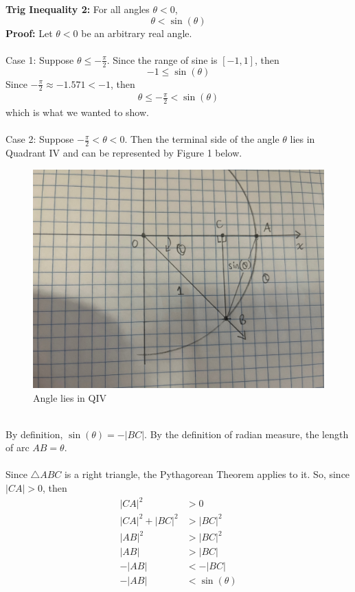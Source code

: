 \documentclass{article}
\begin{document}
	\textbf{Trig Inequality 2:} For all angles $\theta < 0$,
	$$\theta < \sin{(\theta)}$$
	\textbf{Proof:}
	Let $\theta < 0$ be an arbitrary real angle. \\\\
	Case 1: Suppose $\theta \leq -\frac{\pi}{2}$. Since the range of sine is $[-1, 1]$, then
	$$-1 \leq \sin{(\theta)}$$
	Since $-\frac{\pi}{2} \approx -1.571 < -1$, then
	\begin{align*}
		\theta \leq -\frac{\pi}{2} < \sin{(\theta)}
	\end{align*}
	which is what we wanted to show. \\\\
	Case 2: Suppose $-\frac{\pi}{2} < \theta < 0$. Then the terminal side of the angle $\theta$ lies in Quadrant IV and can be represented by Figure 1 below.
	\begin{figure}[h!]
		\includegraphics[width=\linewidth]{Trig_Figure_2.jpg}
		\caption{Angle lies in QIV}
	\end{figure} \\
	By definition, $\sin{(\theta)} = -|BC|$. By the definition of radian measure, the length of arc $AB = \theta$.  \\\\
	Since $\triangle ABC$ is a right triangle, the Pythagorean Theorem applies to it. So, since $|CA| > 0$, then
	\begin{align*}
		|CA|^2 &> 0 \\
		|CA|^2 + |BC|^2 &> |BC|^2 \\
		|AB|^2 &> |BC|^2 \tag{Pythag. Thrm.} \\
		|AB| &> |BC| \tag{Length is positive} \\
		-|AB| &< -|BC| \\
		-|AB| &< \sin{(\theta)}
	\end{align*}
\end{document}

